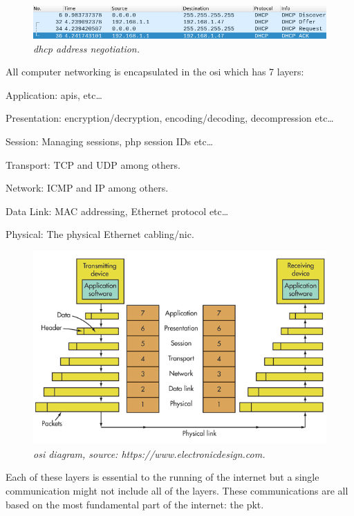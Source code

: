 \documentclass[titlepage]{article}
\begin{document}
\begin{figure}[H]
  \centering
  \includegraphics[width=\textwidth]{dhcp_negotiation.png}
  \caption{\textit{\gls{dhcp} address negotiation.}}\label{dhcp_negotiate}
\end{figure}

All computer networking is encapsulated in the \gls{osi} which has 7 layers\cite{wiki:osimodel}:

\begin{etaremune}
  \item{Application: \gls{api}s, etc\ldots}
  \item{Presentation: encryption/decryption, encoding/decoding, decompression etc\ldots}
  \item{Session: Managing sessions, \gls{php} session IDs etc\ldots}
  \item{Transport: TCP and UDP among others.}
  \item{Network: ICMP and IP among others.}
  \item{Data Link: MAC addressing, Ethernet protocol etc\ldots}
  \item{Physical: The physical Ethernet cabling/\gls{nic}.}
\end{etaremune}

\begin{figure}[H]
  \centering
  \includegraphics[width=\textwidth]{osi_model.png}
    \caption{\textit{%
    \gls{osi} diagram, source: https://www.electronicdesign.com.
}}\label{osi_model}
\end{figure}
Each of these layers is essential to the running of the internet but a single communication might 
not include all of the layers. These communications are all based on the most fundamental part of 
the internet: the \gls{pkt}. 
\end{document}
